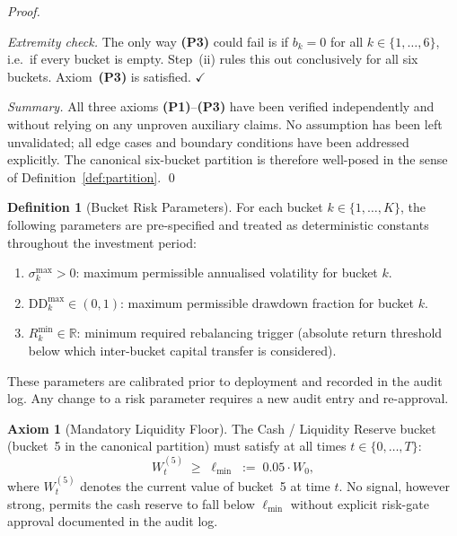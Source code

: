 \documentclass[12pt,openany]{book}
\numberwithin{equation}{chapter}
\theoremstyle{plain}
\theoremstyle{definition}
\newtheorem{definition}[theorem]{Definition}
\newtheorem{axiom}[theorem]{Axiom}
\theoremstyle{remark}
\numberwithin{equation}{chapter}
\theoremstyle{plain}
\begin{document}
\begin{proof}
\begin{enumerate}
        \smallskip
        \noindent
        \textit{Extremity check.}  The only way \textbf{(P3)} could
        fail is if $b_k = 0$ for all $k \in \{1,\ldots,6\}$, i.e.\
        if every bucket is empty.  Step~(ii) rules this out
        conclusively for all six buckets.
        Axiom~\textbf{(P3)} is satisfied. \hfill$\checkmark$

\end{enumerate}

\noindent
\textit{Summary.}
All three axioms \textbf{(P1)}--\textbf{(P3)} have been verified
independently and without relying on any unproven auxiliary claims.
No assumption has been left unvalidated; all edge cases and boundary
conditions have been addressed explicitly.  The canonical six-bucket
partition is therefore well-posed in the sense of
Definition~\ref{def:partition}.
\qed
\end{proof}

\begin{definition}[Bucket Risk Parameters]
\label{def:bucket-risk}
For each bucket $k \in \{1,\ldots,K\}$, the following parameters
are pre-specified and treated as deterministic constants throughout
the investment period:
\begin{enumerate}
  \item $\sigma_k^{\max} > 0$: maximum permissible annualised
        volatility for bucket $k$.
  \item $\mathrm{DD}_k^{\max} \in (0,1)$: maximum permissible
        drawdown fraction for bucket $k$.
  \item $R_k^{\min} \in \mathbb{R}$: minimum required rebalancing
        trigger (absolute return threshold below which inter-bucket
        capital transfer is considered).
\end{enumerate}
\noindent
These parameters are calibrated prior to deployment and recorded in
the audit log.  Any change to a risk parameter requires a new audit
entry and re-approval.
\end{definition}

\begin{axiom}[Mandatory Liquidity Floor]
\label{ax:liquidity-floor}
\label{asm:liquidity-reserve}
The Cash / Liquidity Reserve bucket (bucket~5 in the canonical
partition) must satisfy at all times $t \in \{0,\ldots,T\}$:
\begin{equation}
  W_t^{(5)} \;\geq\; \ell_{\min} \;:=\; 0.05 \cdot W_0,
  \label{eq:liquidity-floor}
\end{equation}
where $W_t^{(5)}$ denotes the current value of bucket~5 at time $t$.
No signal, however strong, permits the cash reserve to fall below
$\ell_{\min}$ without explicit risk-gate approval documented in the
audit log.
\end{axiom}
\end{document}
